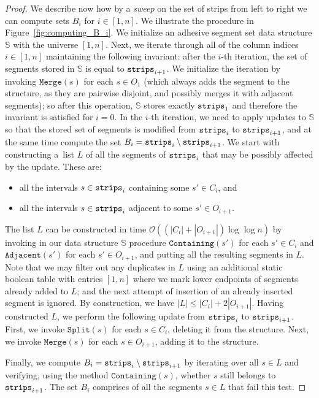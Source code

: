 \documentclass[runningheads]{llncs}
\newcommand{\Oh}{\mathcal{O}}
\renewcommand{\leq}{\leqslant}
\begin{document}
\begin{proof}
	We describe now how by a {\em{sweep}} on the set of strips from left to right we can compute sets $B_i$ for $i\in [1,n]$. We illustrate the procedure in Figure~\ref{fig:computing_B_i}.
	We initialize an adhesive segment set data structure $\mathbb{S}$ with the universe $[1,n]$. Next, we iterate through all of the column indices $i\in [1,n]$ maintaining the following invariant: after the $i$-th iteration, the set of segments stored in $\mathbb{S}$ is equal to $\mathtt{strips}_{i+1}$. We initialize the iteration by invoking $\mathtt{Merge}(s)$ for each $s\in O_1$ (which always adds the segment to the structure, as they are pairwise disjoint, and possibly merges it with adjacent segments); so after this operation, $\mathbb{S}$ stores exactly $\mathtt{strips}_1$ and therefore the invariant is satisfied for $i=0$. In the $i$-th iteration, we need to apply updates to $\mathbb{S}$ so that the stored set of segments is modified from $\mathtt{strips}_i$ to $\mathtt{strips}_{i+1}$, and at the same time compute the set $B_i=\mathtt{strips}_i\setminus \mathtt{strips}_{i+1}$. We start with constructing a~list $L$ of all the segments of $\mathtt{strips}_i$ that may be possibly affected by the update. These are:
	\begin{itemize}
		\item all the intervals $s\in \mathtt{strips}_i$ containing some $s'\in C_i$, and
		\item all the intervals $s\in \mathtt{strips}_i$ adjacent to some $s'\in O_{i+1}$.
	\end{itemize}
	The list $L$ can be constructed in time $\Oh((|C_i|+|O_{i+1}|)\log \log n)$ by invoking in our data structure $\mathbb{S}$ procedure $\mathtt{Containing}(s')$ for each $s'\in C_i$ and $\mathtt{Adjacent}(s')$ for each $s'\in O_{i+1}$, and putting all the resulting segments in $L$. Note that we may filter out any duplicates in $L$ using an additional static boolean table with entries $[1,n]$ where we mark lower endpoints of segments already added to $L$; and the next attempt of insertion of an already inserted segment is ignored. By construction, we have $|L|\leq |C_i|+2|O_{i+1}|$. Having constructed $L$, we perform the following update from $\mathtt{strips}_i$ to $\mathtt{strips}_{i+1}$. First, we invoke $\mathtt{Split}(s)$ for each $s\in C_i$, deleting it from the structure. Next, we invoke $\mathtt{Merge}(s)$ for each $s\in O_{i+1}$, adding it to the structure.
	
	Finally, we compute $B_i=\mathtt{strips}_i\setminus \mathtt{strips}_{i+1}$ by iterating over all $s\in L$ and verifying, using the method $\mathtt{Containing}(s)$, whether $s$ still belongs to $\mathtt{strips}_{i+1}$. The set $B_i$ comprises of all the segments $s\in L$ that fail this test.
	

\end{proof}
\end{document}
